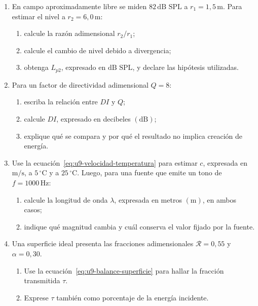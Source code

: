 \begin{enumerate}[label=\textbf{G\arabic*.},leftmargin=*]
    \item En campo aproximadamente libre se miden \(82\,\text{dB SPL}\) a
    \(r_1=1{,}5\,\text{m}\). Para estimar el nivel a
    \(r_2=6{,}0\,\text{m}\):
    \begin{enumerate}
        \item calcule la razón adimensional \(r_2/r_1\);
        \item calcule el cambio de nivel debido a divergencia;
        \item obtenga \(L_{p2}\), expresado en \(\text{dB SPL}\), y declare
        las hipótesis utilizadas.
    \end{enumerate}

    \item Para un factor de directividad adimensional \(Q=8\):
    \begin{enumerate}
        \item escriba la relación entre \(DI\) y \(Q\);
        \item calcule \(DI\), expresado en decibeles \((\text{dB})\);
        \item explique qué se compara y por qué el resultado no implica
        creación de energía.
    \end{enumerate}

    \item Use la ecuación~\eqref{eq:u9-velocidad-temperatura} para estimar
    \(c\), expresada en \(\text{m}/\text{s}\), a
    \(5\,^{\circ}\text{C}\) y a \(25\,^{\circ}\text{C}\). Luego, para una
    fuente que emite un tono de \(f=1000\,\text{Hz}\):
    \begin{enumerate}
        \item calcule la longitud de onda \(\lambda\), expresada en metros
        \((\text{m})\), en ambos casos;
        \item indique qué magnitud cambia y cuál conserva el valor fijado por
        la fuente.
    \end{enumerate}

    \item Una superficie ideal presenta las fracciones adimensionales
    \(\mathcal{R}=0{,}55\) y \(\alpha=0{,}30\).
    \begin{enumerate}
        \item Use la ecuación~\eqref{eq:u9-balance-superficie} para hallar la
        fracción transmitida \(\tau\).
        \item Exprese \(\tau\) también como porcentaje de la energía
        incidente.
    \end{enumerate}


\end{enumerate}
